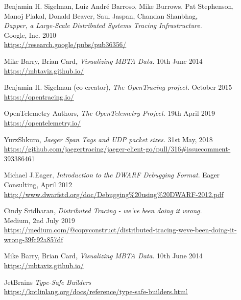 \documentclass[12pt,pdftex,titlepage]{report}
\begin{document}
    \begin{thebibliography}{69}

        Benjamin H. Sigelman, Luiz André Barroso, Mike Burrows, Pat Stephenson, Manoj Plakal, Donald Beaver, Saul Jaspan, Chandan Shanbhag, \\
        \textit{Dapper, a Large-Scale Distributed Systems Tracing Infrastructure.} \\
        Google, Inc. 2010 \\
        \url{https://research.google/pubs/pub36356/}

        Mike Barry, Brian Card, \textit{Visualizing MBTA Data.}
        10th June 2014 \\
        \url{https://mbtaviz.github.io/}

        Benjamin H. Sigelman (co creator), \textit{The OpenTracing project.}
        October 2015 \\
        \url{https://opentracing.io/}

        OpenTelemetry Authors, \textit{The OpenTelemetry Project.} 
        19th April 2019 \\
        \url{https://opentelemetry.io/}

        YurzShkuro, \textit{Jaeger Span Tags and UDP packet sizes.}
        31st May, 2018 \\
        \url{https://github.com/jaegertracing/jaeger-client-go/pull/316#issuecomment-393386461}

        Michael J.Eager, \textit{Introduction to the DWARF Debugging Format.}
        Eager Consulting, April 2012 \\
        \url{http://www.dwarfstd.org/doc/Debugging%20using%20DWARF-2012.pdf}

        Cindy Sridharan, \textit{Distributed Tracing - we've been doing it wrong.} \\
        Medium, 2nd July 2019 \\
        \url{https://medium.com/@copyconstruct/distributed-tracing-weve-been-doing-it-wrong-39fc92a857df}

        Mike Barry, Brian Card, \textit{Visualizing MBTA Data.}
        10th June 2014 \\
        \url{https://mbtaviz.github.io/}

        JetBrains \textit{Type-Safe Builders} \\
        \url{https://kotlinlang.org/docs/reference/type-safe-builders.html}
    \end{thebibliography}
\end{document}
